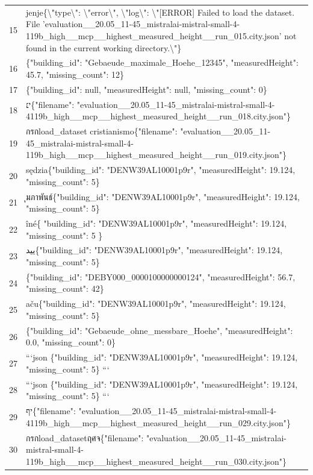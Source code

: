 \documentclass[a4paper,11pt]{article}
\begin{document}
\begin{table}[ht]
\begin{tabular}{r p{12cm}}
15 & jenje\{\textbackslash"type\textbackslash": \textbackslash"error\textbackslash", \textbackslash"log\textbackslash": \textbackslash"[ERROR] Failed to load the dataset. File 'evaluation\_\_20.05\_11-45\_mistralai-mistral-small-4-119b\_high\_\_mcp\_\_highest\_measured\_height\_\_run\_015.city.json' not found in the current working directory.\textbackslash"\} \\
16 & \{"building\_id": "Gebaeude\_maximale\_Hoehe\_12345", "measuredHeight": 45.7, "missing\_count": 12\} \\
17 & \{"building\_id": null, "measuredHeight": null, "missing\_count": 0\} \\
18 & י׆\{"filename": "evaluation\_\_20.05\_11-45\_mistralai-mistral-small-4-4119b\_high\_\_mcp\_\_highest\_measured\_height\_\_run\_018.city.json"\} \\
19 &  กรกload\_dataset cristianismo\{"filename": "evaluation\_\_20.05\_11-45\_mistralai-mistral-small-4-119b\_high\_\_mcp\_\_highest\_measured\_height\_\_run\_019.city.json"\} \\
20 & sędzia\{"building\_id": "DENW39AL10001p9r", "measuredHeight": 19.124, "missing\_count": 5\} \\
21 & ุมภาพันธ์\{"building\_id": "DENW39AL10001p9r", "measuredHeight": 19.124, "missing\_count": 5\} \\
22 & îné\{
  "building\_id": "DENW39AL10001p9r",
  "measuredHeight": 19.124,
  "missing\_count": 5
\} \\
23 & یید\{"building\_id": "DENW39AL10001p9r", "measuredHeight": 19.124, "missing\_count": 5\} \\
24 & \{"building\_id": "DEBY000\_0000100000000124", "measuredHeight": 56.7, "missing\_count": 42\} \\
25 & aču\{"building\_id": "DENW39AL10001p9r", "measuredHeight": 19.124, "missing\_count": 5\} \\
26 & \{"building\_id": "Gebaeude\_ohne\_messbare\_Hoehe", "measuredHeight": 0.0, "missing\_count": 0\} \\
27 & ```json
\{"building\_id": "DENW39AL10001p9r", "measuredHeight": 19.124, "missing\_count": 5\}
``` \\
28 & ```json
\{"building\_id": "DENW39AL10001p9r", "measuredHeight": 19.124, "missing\_count": 5\}
``` \\
29 & יף\{"filename": "evaluation\_\_20.05\_11-45\_mistralai-mistral-small-4-4119b\_high\_\_mcp\_\_highest\_measured\_height\_\_run\_029.city.json"\} \\
30 &  กรกload\_datasetฤศจ\{"filename": "evaluation\_\_20.05\_11-45\_mistralai-mistral-small-4-119b\_high\_\_mcp\_\_highest\_measured\_height\_\_run\_030.city.json"\} \\

\end{tabular}
\end{table}
\end{document}
